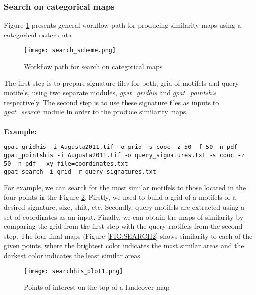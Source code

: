 \subsubsection{Search on categorical maps}
Figure \ref{FIG:SEARCH} presents general workflow path for producing similarity maps using a categorical raster data. 

\begin{figure}[H]
	\centering
	\texttt{[image: search\_scheme.png]}
	\caption{Workflow path for search on categorical maps}
	\label{FIG:SEARCH}
\end{figure}

The first step is to prepare signature files for both, grid of motifels and query motifels, using two separate modules, {\it gpat\_gridhis} and {\it gpat\_pointshis} respectively. 
The second step is to use these signature files as inputs to {\it gpat\_search} module in order to the produce similarity maps.\\\\

{\bf Example:}

\begin{minipage}{\linewidth}
\begin{lstlisting}
gpat_gridhis -i Augusta2011.tif -o grid -s cooc -z 50 -f 50 -n pdf
gpat_pointshis -i Augusta2011.tif -o query_signatures.txt -s cooc -z 50 -n pdf --xy_file=coordinates.txt
gpat_search -i grid -r query_signatures.txt
\end{lstlisting}
\end{minipage}

For example, we can search for the most similar motifels to those located in the four points in the Figure \ref{FIG:SEARCH1}. 
Firstly, we need to build a grid of a motifels of a desired signature, size, shift, etc. 
Secondly, query motifels are extracted using a set of coordinates as an input. 
Finally, we can obtain the maps of similarity by comparing the grid from the first step with the query motifels from the second step.
The four final maps (Figure \ref{FIG:SEARCH2} shows similarity to each of the given points, where the brightest color indicates the most similar areas and the darkest color indicates the least similar areas.

\begin{figure}[H]
	\centering
	\texttt{[image: searchhis\_plot1.png]}
	\caption{Points of interest on the top of a landcover map}
	\label{FIG:SEARCH1}
\end{figure}

